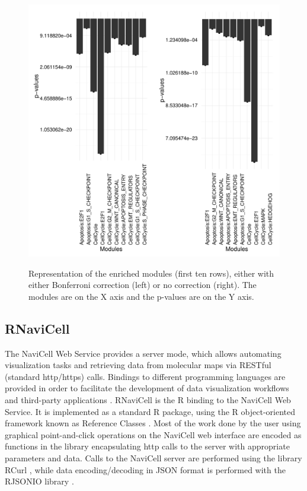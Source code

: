 \documentclass[article]{jss}
\begin{document}
\begin{figure}
	\caption{Representation of the enriched modules (first ten rows), either with either Bonferroni correction (left) or no correction (right). The modules are on the X axis and the p-values are on the Y axis.  }
	\includegraphics{figures/comparison_corrected_unc_bars.pdf}
	\label{fig:barp}

\end{figure}




\subsection{RNaviCell}

The NaviCell Web Service provides a server mode, which allows automating
visualization tasks and retrieving data from molecular maps via RESTful
(standard http/https) calls. Bindings to different programming languages are
provided in order to facilitate the development of data visualization workflows and
third-party applications \citep{bonnet2015navicell}. RNaviCell is the R binding
to the NaviCell Web Service. It is implemented as a standard R package, using
the R object-oriented framework known as Reference Classes \citep{hwR5}. Most
of the work done by the user using graphical point-and-click operations on the
NaviCell web interface are encoded as functions in the library encapsulating
http calls to the server with appropriate parameters and data. Calls to the
NaviCell server are performed using the library RCurl \citep{rcurl2015}, while
data encoding/decoding in JSON format is performed with the RJSONIO library
\citep{rjsonio2014}.
\end{document}
